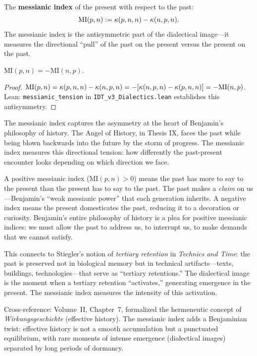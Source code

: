 \begin{definition}
\label{def:messianic-index-formal}
The \textbf{messianic index} of the present with respect to the past:
\[
\mathrm{MI}(p, n) := \kappa(p, n, n) - \kappa(n, p, n).
\]
The messianic index is the antisymmetric part of the dialectical image---it
measures the directional ``pull'' of the past on the present versus the
present on the past.
\end{definition}

\begin{theorem}
\label{thm:messianic-antisymm}
$\mathrm{MI}(p, n) = -\mathrm{MI}(n, p)$.
\end{theorem}

\begin{proof}
$\mathrm{MI}(p, n) = \kappa(p, n, n) - \kappa(n, p, n)
= -[\kappa(n, p, n) - \kappa(p, n, n)] = -\mathrm{MI}(n, p)$.
Lean: \texttt{messianic\_tension} in \texttt{IDT\_v3\_Dialectics.lean}
establishes this antisymmetry.
\end{proof}

\begin{interpretation}
The messianic index captures the asymmetry at the heart of Benjamin's
philosophy of history. The Angel of History, in Thesis IX, faces the past
while being blown backwards into the future by the storm of progress.
The messianic index measures this directional tension: how differently
the past-present encounter looks depending on which direction we face.

A positive messianic index ($\mathrm{MI}(p, n) > 0$) means the past
has more to say to the present than the present has to say to the past.
The past makes a \emph{claim} on us---Benjamin's ``weak messianic power''
that each generation inherits. A negative index means the present
domesticates the past, reducing it to a decoration or curiosity.
Benjamin's entire philosophy of history is a plea for positive messianic
indices: we must allow the past to address us, to interrupt us, to make
demands that we cannot satisfy.

This connects to Stiegler's notion of \textit{tertiary retention} in
\textit{Technics and Time}: the past is preserved not in biological memory
but in technical artifacts---texts, buildings, technologies---that serve
as ``tertiary retentions.'' The dialectical image is the moment when a
tertiary retention ``activates,'' generating emergence in the present.
The messianic index measures the intensity of this activation.

Cross-reference: Volume~II, Chapter~7, formalized the hermeneutic concept
of \textit{Wirkungsgeschichte} (effective history). The messianic index
adds a Benjaminian twist: effective history is not a smooth accumulation
but a punctuated equilibrium, with rare moments of intense emergence
(dialectical images) separated by long periods of dormancy.
\end{interpretation}

